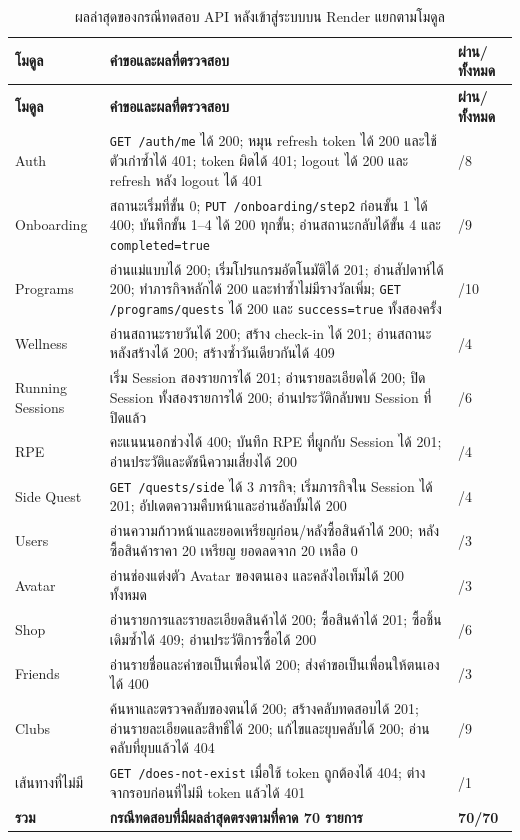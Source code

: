 \begingroup
\footnotesize
\renewcommand{\arraystretch}{1.15}
\KeepTableStart
\begin{longtable}{|>{\raggedright\arraybackslash}p{}|>{\raggedright\arraybackslash}p{}|>{\centering\arraybackslash}p{}|}
\caption{ผลล่าสุดของกรณีทดสอบ API หลังเข้าสู่ระบบบน Render แยกตามโมดูล}\label{tab:backend-authenticated-results}\\ \hline
\textbf{โมดูล} & \textbf{คำขอและผลที่ตรวจสอบ} & \textbf{ผ่าน/ทั้งหมด} \\ \hline
\endfirsthead
\hline
\textbf{โมดูล} & \textbf{คำขอและผลที่ตรวจสอบ} & \textbf{ผ่าน/ทั้งหมด} \\ \hline
\endhead
Auth & \texttt{GET /auth/me} ได้ 200; หมุน refresh token ได้ 200 และใช้ตัวเก่าซ้ำได้ 401; token ผิดได้ 401; logout ได้ 200 และ refresh หลัง logout ได้ 401 & 8/8 \\ \hline
Onboarding & สถานะเริ่มที่ขั้น 0; \texttt{PUT /onboarding/step2} ก่อนขั้น 1 ได้ 400; บันทึกขั้น 1--4 ได้ 200 ทุกขั้น; อ่านสถานะกลับได้ขั้น 4 และ \texttt{completed=true} & 9/9 \\ \hline
Programs & อ่านแม่แบบได้ 200; เริ่มโปรแกรมอัตโนมัติได้ 201; อ่านสัปดาห์ได้ 200; ทำภารกิจหลักได้ 200 และทำซ้ำไม่มีรางวัลเพิ่ม; \texttt{GET /programs/quests} ได้ 200 และ \texttt{success=true} ทั้งสองครั้ง & 10/10 \\ \hline
Wellness & อ่านสถานะรายวันได้ 200; สร้าง check-in ได้ 201; อ่านสถานะหลังสร้างได้ 200; สร้างซ้ำวันเดียวกันได้ 409 & 4/4 \\ \hline
Running Sessions & เริ่ม Session สองรายการได้ 201; อ่านรายละเอียดได้ 200; ปิด Session ทั้งสองรายการได้ 200; อ่านประวัติกลับพบ Session ที่ปิดแล้ว & 6/6 \\ \hline
RPE & คะแนนนอกช่วงได้ 400; บันทึก RPE ที่ผูกกับ Session ได้ 201; อ่านประวัติและดัชนีความเสี่ยงได้ 200 & 4/4 \\ \hline
Side Quest & \texttt{GET /quests/side} ได้ 3 ภารกิจ; เริ่มภารกิจใน Session ได้ 201; อัปเดตความคืบหน้าและอ่านอัลบั้มได้ 200 & 4/4 \\ \hline
Users & อ่านความก้าวหน้าและยอดเหรียญก่อน/หลังซื้อสินค้าได้ 200; หลังซื้อสินค้าราคา 20 เหรียญ ยอดลดจาก 20 เหลือ 0 & 3/3 \\ \hline
Avatar & อ่านช่องแต่งตัว Avatar ของตนเอง และคลังไอเท็มได้ 200 ทั้งหมด & 3/3 \\ \hline
Shop & อ่านรายการและรายละเอียดสินค้าได้ 200; ซื้อสินค้าได้ 201; ซื้อชิ้นเดิมซ้ำได้ 409; อ่านประวัติการซื้อได้ 200 & 6/6 \\ \hline
Friends & อ่านรายชื่อและคำขอเป็นเพื่อนได้ 200; ส่งคำขอเป็นเพื่อนให้ตนเองได้ 400 & 3/3 \\ \hline
Clubs & ค้นหาและตรวจคลับของตนได้ 200; สร้างคลับทดสอบได้ 201; อ่านรายละเอียดและสิทธิ์ได้ 200; แก้ไขและยุบคลับได้ 200; อ่านคลับที่ยุบแล้วได้ 404 & 9/9 \\ \hline
เส้นทางที่ไม่มี & \texttt{GET /does-not-exist} เมื่อใช้ token ถูกต้องได้ 404; ต่างจากรอบก่อนที่ไม่มี token แล้วได้ 401 & 1/1 \\ \hline
\textbf{รวม} & \textbf{กรณีทดสอบที่มีผลล่าสุดตรงตามที่คาด 70 รายการ} & \textbf{70/70} \\ \hline
\end{longtable}
\endgroup

